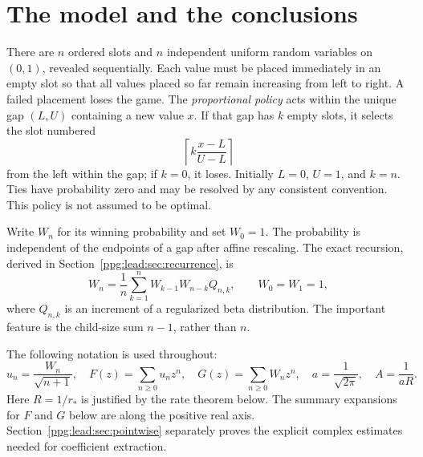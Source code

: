 \documentclass[11pt,letterpaper]{article}
\theoremstyle{remark}\newtheorem{remark}[theorem]{Remark}
\numberwithin{equation}{section}
\begin{document}
\section{The model and the conclusions}\label{ppg:lead:sec:model}
There are $n$ ordered slots and $n$ independent uniform random variables on $(0,1)$, revealed sequentially. Each value must be placed immediately in an empty slot so that all values placed so far remain increasing from left to right. A failed placement loses the game. The \emph{proportional policy} acts within the unique gap $(L,U)$ containing a new value $x$. If that gap has $k$ empty slots, it selects the slot numbered
\[
 \left\lceil k\frac{x-L}{U-L}\right\rceil
\]
from the left within the gap; if $k=0$, it loses. Initially $L=0$, $U=1$, and $k=n$. Ties have probability zero and may be resolved by any consistent convention. This policy is not assumed to be optimal.

Write $W_n$ for its winning probability and set $W_0=1$. The probability is independent of the endpoints of a gap after affine rescaling. The exact recursion, derived in Section~\ref{ppg:lead:sec:recurrence}, is
\begin{equation}\label{ppg:lead:eq:recurrence}
 W_n=\frac1n\sum_{k=1}^n W_{k-1}W_{n-k}Q_{n,k},\qquad W_0=W_1=1,
\end{equation}
where $Q_{n,k}$ is an increment of a regularized beta distribution. The important feature is the child-size sum $n-1$, rather than $n$.

The following notation is used throughout:
\begin{equation}\label{ppg:lead:eq:notation}
 u_n=\frac{W_n}{\sqrt{n+1}},\quad
 F(z)=\sum_{n\ge0}u_nz^n,\quad G(z)=\sum_{n\ge0}W_nz^n,
 \quad a=\frac1{\sqrt{2\pi}},\quad A=\frac1{aR}.
\end{equation}
Here $R=1/r_*$ is justified by the rate theorem below. The summary expansions for $F$ and $G$ below are along the positive real axis. Section~\ref{ppg:lead:sec:pointwise} separately proves the explicit complex estimates needed for coefficient extraction.
\end{document}
